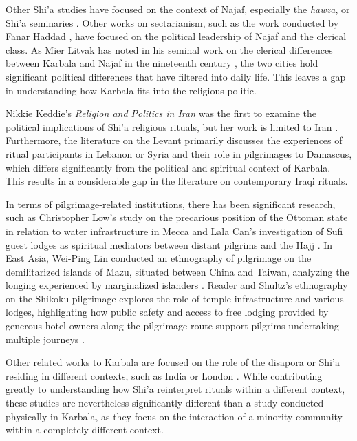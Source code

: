 Other Shi'a studies have focused on the context of Najaf, especially the \emph{hawza}, or Shi'a seminaries \cite{kassem_modernization_2018} \cite{mottahedeh_najaf_2016}. Other works on sectarianism, such as the work conducted by Fanar Haddad \cite{haddad_understanding_2020}, have focused on the political leadership of Najaf and the clerical class. As Mier Litvak has noted in his seminal work on the clerical differences between Karbala and Najaf in the nineteenth century \cite{litvak_shii_2002}, the two cities hold significant political differences that have filtered into daily life. This leaves a gap in understanding how Karbala fits into the religious politic. 

Nikkie Keddie's \emph{Religion and Politics in Iran} was the first to examine the political implications of Shi'a religious rituals, but her work is limited to Iran \cite{keddie_religion_1983}. Furthermore, the literature on the Levant primarily discusses the experiences of ritual participants in Lebanon or Syria and their role in pilgrimages to Damascus, which differs significantly from the political and spiritual context of Karbala. This results in a considerable gap in the literature on contemporary Iraqi rituals.

In terms of pilgrimage-related institutions, there has been significant research, such as Christopher Low's study on the precarious position of the Ottoman state in relation to water infrastructure in Mecca \cite{low_imperial_2020} and Lala Can's investigation of Sufi guest lodges as spiritual mediators between distant pilgrims and the Hajj \cite{can_spiritual_2020}. In East Asia, Wei-Ping Lin conducted an ethnography of pilgrimage on the demilitarized islands of Mazu, situated between China and Taiwan, analyzing the longing experienced by marginalized islanders \cite{lin_virtual_2014}. Reader and Shultz's ethnography on the Shikoku pilgrimage explores the role of temple infrastructure and various lodges, highlighting how public safety and access to free lodging provided by generous hotel owners along the pilgrimage route support pilgrims undertaking multiple journeys \cite{reader_pilgrims_2021}.

Other related works to Karbala are focused on the role of the disapora or Shi'a residing in different contexts, such as India \cite{pinault_horse_2016} or London \cite{dogra_karbala_2017} \cite{marei_lamenting_2021}. While contributing greatly to understanding how Shi'a reinterpret rituals within a different context, these studies are nevertheless significantly different than a study conducted physically in Karbala, as they focus on the interaction of a minority community within a completely different context. 

